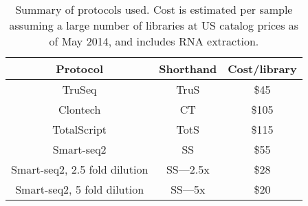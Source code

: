 \begin{table}[htdp]
\caption{Summary of protocols used. Cost is estimated per sample assuming a
     large number of libraries at US catalog prices as of May 2014, and includes RNA extraction.  }
\begin{tabular}{|c|c|c|}
Protocol & Shorthand & Cost/library \\\hline
TruSeq & TruS & \$45 \\
Clontech & CT & \$105 \\
TotalScript & TotS & \$115 \\
Smart-seq2 & SS & \$55 \\
Smart-seq2, 2.5 fold dilution & SS---2.5x & \$28 \\
Smart-seq2, 5 fold dilution & SS---5x & \$20 \\
\end{tabular}
\label{tab:protocolcosts}
\end{table}


